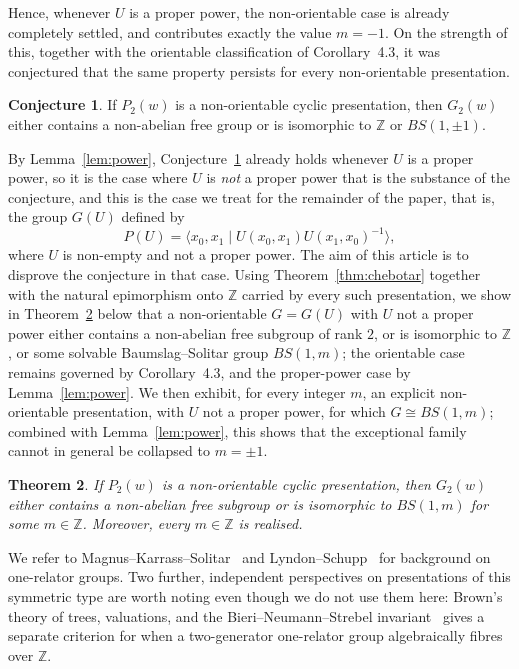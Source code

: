 \documentclass[a4paper,12pt,oneside]{article}
\newtheorem{theorem}{Theorem}
\theoremstyle{definition}
\newtheorem{conjecture}[theorem]{Conjecture}
\begin{document}
Hence, whenever $U$ is a proper power, the non-orientable case is already completely settled, and contributes exactly the value $m=-1$. On the strength of this, together with the orientable classification of Corollary~4.3, it was conjectured that the same property persists for every non-orientable presentation.

\begin{conjecture}\cite[Conjecture~4.5]{ChinyereWilliams2023}\label{conj:cw}
If $P_2(w)$ is a non-orientable cyclic presentation, then $G_2(w)$ either contains a non-abelian free group or is isomorphic to $\mathbb{Z}$ or $BS(1,\pm 1)$.
\end{conjecture}

By Lemma~\ref{lem:power}, Conjecture~\ref{conj:cw} already holds whenever $U$ is a proper power, so it is the case where $U$ is \emph{not} a proper power that is the substance of the conjecture, and this is the case we treat for the remainder of the paper, that is, the group $G(U)$ defined by
\[P(U)=\langle x_0,x_1\mid U(x_0,x_1)U(x_1,x_0)^{-1}\rangle,\] where $U$ is non-empty and not a proper power. The aim of this article is to disprove the conjecture in that case. Using Theorem~\ref{thm:chebotar} together with the natural epimorphism onto $\mathbb{Z}$ carried by every such presentation, we show in Theorem~\ref{thm:main} below that a non-orientable $G=G(U)$ with $U$ not a proper power either contains a non-abelian free subgroup of rank $2$, or is isomorphic to $\mathbb{Z}$, or some solvable Baumslag--Solitar group $BS(1,m)$; the orientable case remains governed by Corollary~4.3, and the proper-power case by Lemma~\ref{lem:power}. We then exhibit, for every integer $m$, an explicit non-orientable presentation, with $U$ not a proper power, for which $G\cong BS(1,m)$; combined with Lemma~\ref{lem:power}, this shows that the exceptional family cannot in general be collapsed to $m=\pm1$.

\begin{theorem}\label{thm:main}
If \(P_2(w)\) is a non-orientable cyclic presentation, then \(G_2(w)\) either contains a non-abelian free subgroup or is isomorphic to \(BS(1,m)\) for some \(m\in\mathbb{Z}\). Moreover, every \(m\in\mathbb{Z}\) is realised.
\end{theorem}

We refer to Magnus--Karrass--Solitar~\cite{MKS} and Lyndon--Schupp~\cite{LyndonSchupp} for background on one-relator groups. Two further, independent perspectives on presentations of this symmetric type are worth noting even though we do not use them here: Brown's theory of trees, valuations, and the Bieri--Neumann--Strebel invariant~\cite{Brown1987} gives a separate criterion for when a two-generator one-relator group algebraically fibres over $\mathbb{Z}$.
\end{document}

